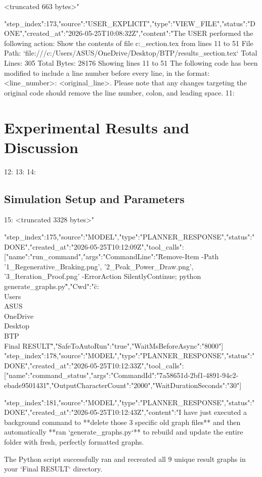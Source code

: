 \begin{table}[t]
{\begin{table}[t]
{{{{{{{{{{{{{{{<truncated 663 bytes>"}
{"step_index":173,"source":"USER_EXPLICIT","type":"VIEW_FILE","status":"DONE","created_at":"2026-05-25T10:08:32Z","content":"The USER performed the following action:
Show the contents of file c:\Users\ASUS\OneDrive\Desktop\BTP\results_section.tex from lines 11 to 51
File Path: `file:///c:/Users/ASUS/OneDrive/Desktop/BTP/results_section.tex`
Total Lines: 305
Total Bytes: 28176
Showing lines 11 to 51
The following code has been modified to include a line number before every line, in the format: <line_number>: <original_line>. Please note that any changes targeting the original code should remove the line number, colon, and leading space.
11: \section{Experimental Results and Discussion}
12: \label{sec:results}
13: 
14: \subsection{Simulation Setup and Parameters}
15: 
<truncated 3328 bytes>"}
{"step_index":175,"source":"MODEL","type":"PLANNER_RESPONSE","status":"DONE","created_at":"2026-05-25T10:12:09Z","tool_calls":[{"name":"run_command","args":{"CommandLine":"\"Remove-Item -Path '1_Regenerative_Braking.png', '2_Peak_Power_Draw.png', '3_Iteration_Proof.png' -ErrorAction SilentlyContinue; python generate_graphs.py\"","Cwd":"\"c:\\Users\\ASUS\\OneDrive\\Desktop\\BTP\\Final RESULT\"","SafeToAutoRun":"true","WaitMsBeforeAsync":"8000"}}]}
{"step_index":178,"source":"MODEL","type":"PLANNER_RESPONSE","status":"DONE","created_at":"2026-05-25T10:12:33Z","tool_calls":[{"name":"command_status","args":{"CommandId":"\"7a58651d-2bf1-4891-94c2-ebade9501431\"","OutputCharacterCount":"2000","WaitDurationSeconds":"30"}}]}
{"step_index":181,"source":"MODEL","type":"PLANNER_RESPONSE","status":"DONE","created_at":"2026-05-25T10:12:43Z","content":"I have just executed a background command to **delete those 3 specific old graph files** and then automatically **ran `generate_graphs.py`** to rebuild and update the entire folder with fresh, perfectly formatted graphs.

The Python script successfully ran and recreated all 9 unique result graphs in your `Final RESULT` directory. 

}}}}}}}}}}}}}}}
\end{table}}
\end{table}
